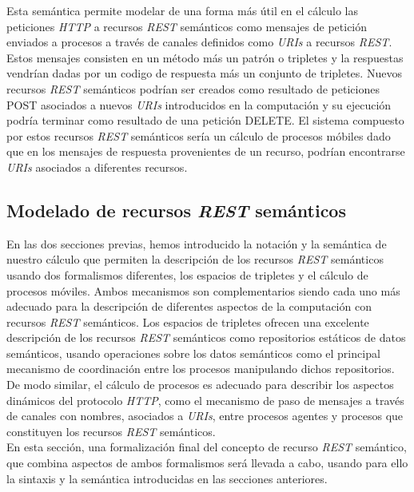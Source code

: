 Esta sem\'antica permite modelar de una forma m\'as \'util en el c\'alculo las peticiones \textit{HTTP} a recursos \textit{REST} sem\'anticos como mensajes de petici\'on enviados a procesos a trav\'es de canales definidos como \textit{URIs} a recursos \textit{REST}. Estos mensajes consisten en un m\'etodo m\'as un patr\'on o tripletes y la respuestas vendr\'ian dadas por un codigo de respuesta m\'as un conjunto de tripletes. Nuevos recursos \textit{REST} sem\'anticos podr\'ian ser creados como resultado de peticiones POST asociados a nuevos \textit{URIs} introducidos en la computaci\'on y su ejecuci\'on podr\'ia terminar como resultado de una petici\'on DELETE. El sistema compuesto por estos recursos \textit{REST} sem\'anticos ser\'ia un c\'alculo de procesos m\'obiles dado que en los mensajes de respuesta provenientes de un recurso, podr\'ian encontrarse \textit{URIs} asociados a diferentes recursos.

\subsection{Modelado de recursos \textit{REST} sem\'anticos}

En las dos secciones previas, hemos introducido la notaci\'on y la sem\'antica de nuestro c\'alculo que permiten la descripci\'on de los recursos \textit{REST} sem\'anticos usando dos formalismos diferentes, los espacios de tripletes y el c\'alculo de procesos m\'oviles. Ambos mecanismos son complementarios siendo cada uno m\'as adecuado para la descripci\'on de diferentes aspectos de la computaci\'on con recursos \textit{REST} sem\'anticos. Los espacios de tripletes ofrecen una excelente descripci\'on de los recursos \textit{REST} sem\'anticos como repositorios est\'aticos de datos sem\'anticos, usando operaciones sobre los datos sem\'anticos como el principal mecanismo de coordinaci\'on entre los procesos manipulando dichos repositorios. De modo similar, el c\'alculo de procesos es adecuado para describir los aspectos din\'amicos del  protocolo \textit{HTTP}, como el mecanismo de paso de mensajes a trav\'es de canales con nombres, asociados a \textit{URIs}, entre procesos agentes y procesos que constituyen los recursos \textit{REST} sem\'anticos.\\
En esta secci\'on, una formalizaci\'on final del concepto de recurso \textit{REST} sem\'antico, que combina aspectos de ambos formalismos ser\'a llevada a cabo, usando para ello la sintaxis y la sem\'antica introducidas en las secciones anteriores.\\


